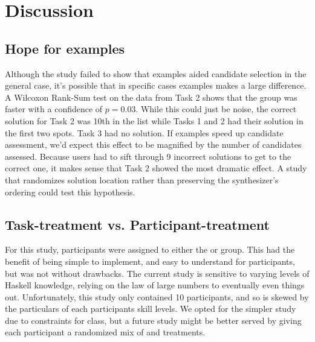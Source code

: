 \section{Discussion}
\label{sec:discussion}

\subsection{Hope for examples}
Although the study failed to show that examples aided candidate selection in
the general case, it's possible that in specific cases examples makes a large difference.
%
A Wilcoxon Rank-Sum test on the data from Task 2 shows that the \examples
group was faster with a confidence of $p=0.03$.
%
While this could just be noise, the correct solution for Task 2 was 10th in
the list while Tasks 1 and 2 had their solution in the first two spots.
%
Task 3 had no solution.
%
If examples speed up candidate assessment, we'd expect this effect to be
magnified by the number of candidates assessed.
%
Because users had to sift through 9 incorrect solutions to get to the correct
one, it makes sense that Task 2 showed the most dramatic effect.
%
A study that randomizes solution location rather than preserving the synthesizer's ordering
could test this hypothesis.

\subsection{Task-treatment vs. Participant-treatment}
For this study, participants were assigned to either the \examples or
\noexamples group.
%
This had the benefit of being simple to implement, and easy to understand for
participants, but was not without drawbacks.
%
The current study is sensitive to varying levels of Haskell knowledge, relying on
the law of large numbers to eventually even things out.
%
Unfortunately, this study only contained 10 participants, and so is skewed by
the particulars of each participants skill levels.
%
We opted for the simpler study due to constraints for class, but a future
study might be better served by giving each participant a randomized mix of \examples
and \noexamples treatments.
